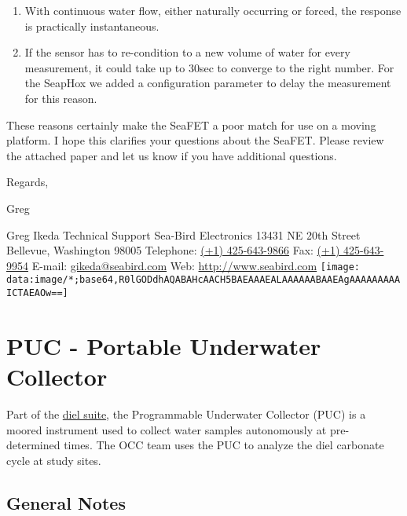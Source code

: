 \documentclass[]{book}
\begin{document}
\begin{enumerate}
\def\labelenumi{\alph{enumi})}
\item
  With continuous water flow, either naturally occurring or forced, the
  response is practically instantaneous.
\item
  If the sensor has to re-condition to a new volume of water for every
  measurement, it could take up to 30sec to converge to the right
  number. For the SeapHox we added a configuration parameter to delay
  the measurement for this reason.
\end{enumerate}

These reasons certainly make the SeaFET a poor match for use on a moving
platform. I hope this clarifies your questions about the SeaFET. Please
review the attached paper and let us know if you have additional
questions.

Regards,

Greg

Greg Ikeda Technical Support Sea-Bird Electronics 13431 NE 20th Street
Bellevue, Washington 98005 Telephone:
\href{nulltel:\%28\%2B1\%29\%20425-643-9866}{(+1) 425-643-9866} Fax:
\href{nulltel:\%28\%2B1\%29\%20425-643-9954}{(+1) 425-643-9954} E-mail:
\href{nullmailto:gikeda@seabird.com}{gikeda@seabird.com} Web:
\href{http://www.seabird.com/}{http://www.seabird.com}
\texttt{[image: data:image/*;base64,R0lGODdhAQABAHcAACH5BAEAAAEALAAAAAABAAEAgAAAAAAAAAICTAEAOw==]}

\chapter{PUC - Portable Underwater Collector}\label{puc}

Part of the \protect\hyperlink{dielsuite}{diel suite}, the Programmable
Underwater Collector (PUC) is a moored instrument used to collect water
samples autonomously at pre-determined times. The OCC team uses the PUC
to analyze the diel carbonate cycle at study sites.

\section{General Notes}\label{general-notes}
\end{document}
